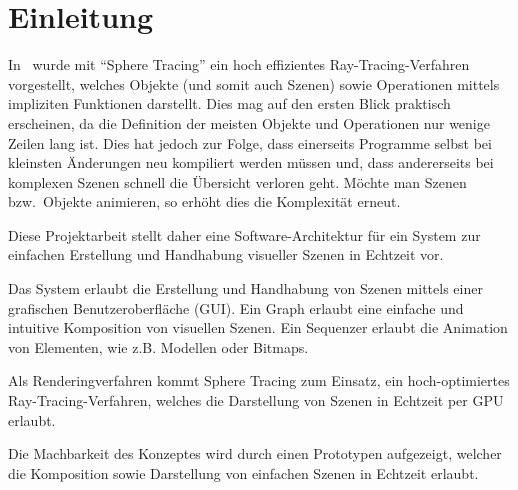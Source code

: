 
\chapter{Einleitung}
\label{chap:10_introduction}

In~\cite{osterwalder_sven_volume_2016} wurde mit ``Sphere Tracing'' ein hoch
effizientes Ray-Tracing-Verfahren vorgestellt, welches Objekte (und somit auch
Szenen) sowie Operationen mittels impliziten Funktionen darstellt. Dies mag auf
den ersten Blick praktisch erscheinen, da die Definition der meisten Objekte
und Operationen nur wenige Zeilen lang ist. Dies hat jedoch zur Folge, dass
einerseits Programme selbst bei kleinsten Änderungen neu kompiliert werden
müssen und, dass andererseits bei komplexen Szenen schnell die Übersicht
verloren geht. Möchte man Szenen bzw.\ Objekte animieren, so erhöht dies die
Komplexität erneut.

Diese Projektarbeit stellt daher eine Software-Architektur für ein System zur
einfachen Erstellung und Handhabung visueller Szenen in Echtzeit vor.

Das System erlaubt die Erstellung und Handhabung von Szenen mittels einer
grafischen Benutzeroberfläche (GUI). Ein Graph erlaubt eine einfache und
intuitive Komposition von visuellen Szenen. Ein  Sequenzer erlaubt die Animation von Elementen, wie z.B. Modellen
oder Bitmaps.

Als  Renderingverfahren kommt Sphere Tracing
zum Einsatz, ein hoch-optimiertes Ray-Tracing-Verfahren, welches die
Darstellung von Szenen in Echtzeit per  GPU erlaubt.

Die Machbarkeit des  Konzeptes wird
durch einen Prototypen aufgezeigt, welcher die Komposition sowie Darstellung
von einfachen Szenen in Echtzeit erlaubt.
